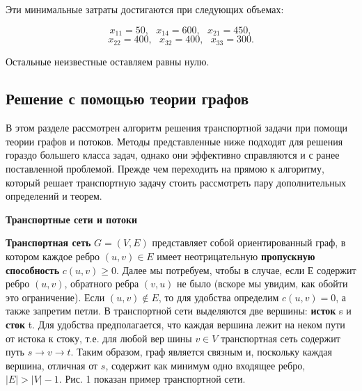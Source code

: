 \documentclass[a4paper,12pt]{article}
\begin{document}
	Эти минимальные затраты достигаются при следующих объемах:
	
	\[
		x_{11} = 50, \ \ \ x_{14} = 600, \ \ \ x_{21} = 450,
	\]
	\[
		x_{22} = 400, \ \ \ x_{32} = 400, \ \ \ x_{33} = 300.
	\]
	
	Остальные неизвестные оставляем равны нулю.
	\clearpage

	\subsection{Решение с помощью теории графов}
	
	В этом разделе рассмотрен алгоритм решения транспортной задачи при помощи теории графов и потоков. Методы представленные ниже подходят для решения гораздо большего класса задач, однако они эффективно справляются и с ранее поставленной проблемой. Прежде чем переходить на прямою к алгоритму, который решает транспортную задачу стоить рассмотреть пару дополнительных определений и теорем.
	
	\textbf{Транспортные сети и потоки}
	
	\textbf{Транспортная сеть} $G = (V, E)$ представляет собой ориентированный граф, в котором каждое ребро $(u, v) \in E$ имеет неотрицательную \textbf{ пропускную способность} $c(u,v) \geqslant 0$. Далее мы потребуем, чтобы в случае, если $Е$ содержит ребро $(u,v)$, обратного ребра $(v,u)$ не было (вскоре мы	увидим, как обойти это ограничение). Если $(u,v) \notin E$, то для удобства определим $c(u,v) = 0$, а также запретим петли. В транспортной сети выделяются две вершины: \textbf{исток} s и \textbf{сток} t. Для удобства предполагается, что каждая вершина лежит на неком пути от истока к стоку, т.е. для любой вер	шины $v \in V$ транспортная сеть содержит путь $s \longrightarrow v \longrightarrow t$. Таким образом, граф является связным и, поскольку каждая вершина, отличная от $s$, содержит как минимум одно входящее ребро, $|E| > |V| - 1$. Рис. 1 показан пример транспортной сети.
\end{document}
